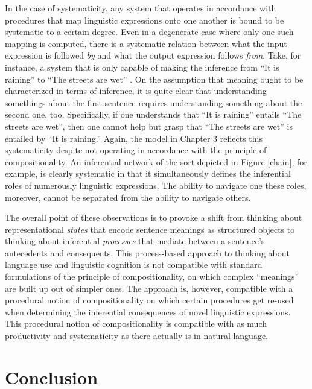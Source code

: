 In the case of systematicity, any system that operates in accordance with procedures that map linguistic expressions onto one another is bound to be systematic to a certain degree. Even in a degenerate case where only one such mapping is computed, there is a systematic relation between what the input expression is followed \textit{by} and what the output expression follows \textit{from}. Take, for instance, a system that is only capable of making the inference from ``It is raining'' to ``The streets are wet'' \citep[][p. 313]{Sellars:1954}. On the assumption that meaning ought to be characterized in terms of inference, it is quite clear that understanding somethings about the first sentence requires understanding something about the second one, too. Specifically, if one understands that ``It is raining'' entails ``The streets are wet'', then one cannot help but grasp that ``The streets are wet'' is entailed by ``It is raining.'' Again, the model in Chapter 3 reflects this systematicity despite not operating in accordance with the principle of compositionality. An inferential network of the sort depicted in Figure \ref{chain}, for example, is clearly systematic in that it simultaneously defines the inferential roles of numerously linguistic expressions. The ability to navigate one these roles, moreover, cannot be separated from the ability to navigate others. 

The overall point of these observations is to provoke a shift from thinking about representational \textit{states} that encode sentence meanings as structured objects to thinking about inferential \textit{processes} that mediate between a sentence's antecedents and consequents. This process-based approach to thinking about language use and linguistic cognition is not compatible with standard formulations of the principle of compositionality, on which complex ``meanings'' are built up out of simpler ones. The approach is, however, compatible with a procedural notion of compositionality on which certain procedures get re-used when determining the inferential consequences of novel linguistic expressions. This procedural notion of compositionality is compatible with as much productivity and systematicity as there actually is in natural language. 

\section{Conclusion}

